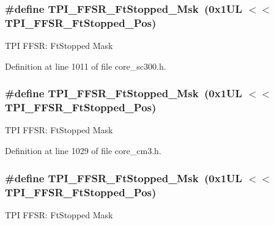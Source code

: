 \subsubsection[{\texorpdfstring{T\+P\+I\+\_\+\+F\+F\+S\+R\+\_\+\+Ft\+Stopped\+\_\+\+Msk}{TPI_FFSR_FtStopped_Msk}}]{\setlength{\rightskip}{0pt plus 5cm}\#define T\+P\+I\+\_\+\+F\+F\+S\+R\+\_\+\+Ft\+Stopped\+\_\+\+Msk~(0x1\+U\+L $<$$<$ T\+P\+I\+\_\+\+F\+F\+S\+R\+\_\+\+Ft\+Stopped\+\_\+\+Pos)}\hypertarget{group___c_m_s_i_s___t_p_i_ga1ab6c3abe1cf6311ee07e7c479ce5f78}{}\label{group___c_m_s_i_s___t_p_i_ga1ab6c3abe1cf6311ee07e7c479ce5f78}
T\+PI F\+F\+SR\+: Ft\+Stopped Mask 

Definition at line 1011 of file core\+\_\+sc300.\+h.

\subsubsection[{\texorpdfstring{T\+P\+I\+\_\+\+F\+F\+S\+R\+\_\+\+Ft\+Stopped\+\_\+\+Msk}{TPI_FFSR_FtStopped_Msk}}]{\setlength{\rightskip}{0pt plus 5cm}\#define T\+P\+I\+\_\+\+F\+F\+S\+R\+\_\+\+Ft\+Stopped\+\_\+\+Msk~(0x1\+U\+L $<$$<$ T\+P\+I\+\_\+\+F\+F\+S\+R\+\_\+\+Ft\+Stopped\+\_\+\+Pos)}\hypertarget{group___c_m_s_i_s___t_p_i_ga1ab6c3abe1cf6311ee07e7c479ce5f78}{}\label{group___c_m_s_i_s___t_p_i_ga1ab6c3abe1cf6311ee07e7c479ce5f78}
T\+PI F\+F\+SR\+: Ft\+Stopped Mask 

Definition at line 1029 of file core\+\_\+cm3.\+h.

\subsubsection[{\texorpdfstring{T\+P\+I\+\_\+\+F\+F\+S\+R\+\_\+\+Ft\+Stopped\+\_\+\+Msk}{TPI_FFSR_FtStopped_Msk}}]{\setlength{\rightskip}{0pt plus 5cm}\#define T\+P\+I\+\_\+\+F\+F\+S\+R\+\_\+\+Ft\+Stopped\+\_\+\+Msk~(0x1\+U\+L $<$$<$ T\+P\+I\+\_\+\+F\+F\+S\+R\+\_\+\+Ft\+Stopped\+\_\+\+Pos)}\hypertarget{group___c_m_s_i_s___t_p_i_ga1ab6c3abe1cf6311ee07e7c479ce5f78}{}\label{group___c_m_s_i_s___t_p_i_ga1ab6c3abe1cf6311ee07e7c479ce5f78}
T\+PI F\+F\+SR\+: Ft\+Stopped Mask 

